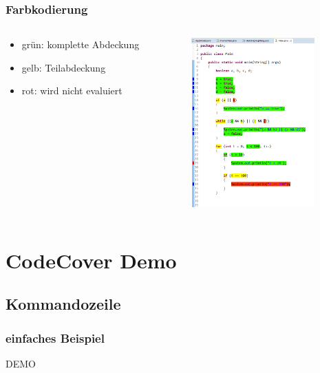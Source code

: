 \documentclass{beamer}
\begin{document}
  \begin{frame}\frametitle{Farbkodierung}
    \begin{columns}
      \begin{column}{5cm}
        \begin{itemize}
          \item grün: komplette Abdeckung
          \item gelb: Teilabdeckung
          \item rot: wird nicht evaluiert
        \end{itemize}
        \vspace{1cm}
      \end{column}
      \begin{column}{5cm}
        \begin{overprint}
          \includegraphics[height=65mm]{pictures/farben.png}
        \end{overprint}
      \end{column}
    \end{columns}
  \end{frame}

  \section{CodeCover Demo}
  \subsection{Kommandozeile}
  \begin{frame}\frametitle{einfaches Beispiel}
    \centering \Huge{DEMO}\\
  \end{frame}
\end{document}
